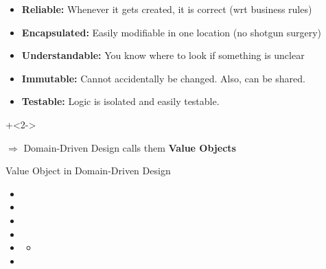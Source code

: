 \begin{frame}[fragile]{\de{}\en{}}

\begin{itemize}
\item \textbf{Reliable:} Whenever it gets created, it is correct (wrt business rules)
\vspace{1em}
\item \textbf{Encapsulated:} Easily modifiable in one location (no shotgun surgery)
\vspace{1em}
\item \textbf{Understandable:} You know where to look if something is unclear
\vspace{1em}
\item \textbf{Immutable:} Cannot accidentally be changed. Also, can be shared.
\vspace{1em}
\item \textbf{Testable:} Logic is isolated and easily testable.
\end{itemize}

\onslide+<2->

\vspace{2.5em}
{
\Large
$\Longrightarrow$ Domain-Driven Design calls them \textbf{Value Objects}
}

\end{frame}

\begin{frame}{Value Object in Domain-Driven Design}
\begin{itemize}
\item {}
\item {}
\item {}
\item {}
\item {}
\begin{itemize}
\item {}
\end{itemize}
\item {}
\end{itemize}
\end{frame}


